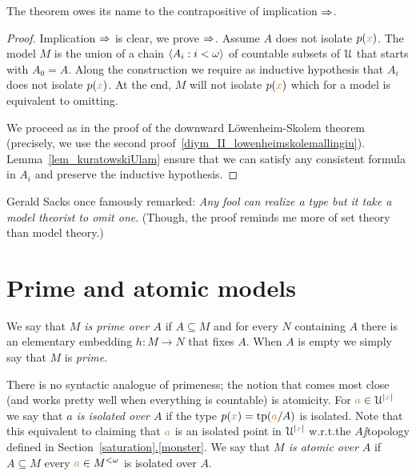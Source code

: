 \documentclass[creche.tex]{subfiles}
\begin{document}
The theorem owes its name to the contrapositive of implication $\Rightarrow$.

\begin{proof}
Implication $\Rightarrow$ is clear, we prove $\Rightarrow$. Assume $A$ does not isolate $p({\color{brown} x})$. The model $M$ is the union of a chain $\langle A_i:i<\omega\rangle$ of countable subsets of $\EuScript U$ that starts with $A_0=A$. Along the construction we require as inductive hypothesis that $A_i$ does not isolate $p({\color{brown} x})$. At the end, $M$ will not isolate $p({\color{brown} x})$ which for a model is equivalent to omitting. 

We proceed as in the proof of the downward L\"owenheim-Skolem theorem (precisely, we use the second proof~\ref{diym_II_lowenheimskolemallingiu}). Lemma~\ref{lem_kuratowskiUlam} ensure that we can satisfy any consistent formula in $A_i$ and preserve the inductive hypothesis.
\end{proof}

Gerald Sacks once famously remarked: \textit{Any fool can realize a type but it take a model theorist to omit one}. (Though, the proof reminds me more of set theory than model theory.)


\section{Prime and atomic models}



We say that \emph{$M$ is prime over $A$\/} if $A\subseteq M$ and for every $N$ containing $A$ there is an elementary embedding $h:M\to N$ that fixes $A$. When $A$ is empty we simply say that $M$ is \emph{prime}. 

There is no syntactic analogue of primeness; the notion that comes most close (and works pretty well when everything is countable) is atomicity. For ${\color{brown} a}\in\EuScript U^{|{\color{brown} x}|}$ we say that \emph{$a$ is isolated over $A$\/} if the type $p({\color{brown} x})={\rm tp}({\color{brown} a}/A)$ is isolated. Note that this equivalent to claiming that ${\color{brown} a}$ is an isolated point in $\EuScript U^{|{\color{brown} x}|}$ w.r.t.\@ the $A\jj$topology defined in Section~\hyperref[saturation]{\ref*{saturation}.\ref*{monster}}. We say that \emph{$M$ is atomic over $A$\/} if $A\subseteq M$ every ${\color{brown} a}\in M^{<\omega}$ is isolated over $A$.

\end{document}
